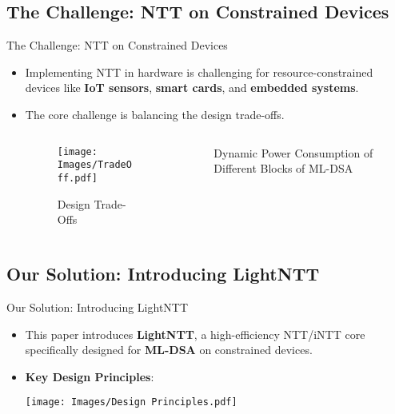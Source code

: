 \documentclass[
	10pt, t,
	hyperref={
		colorlinks,
		citecolor=CtpLatteTeal,
		linkcolor=CtpLatteTeal,
		urlcolor=CtpLatteBlue,
		pdfauthor={Bardia Taghavi},
		pdftitle={LightNTT: A Tiny NTT/iNTT Core for ML-DSA Featuring a Constant-Geometry Pipelined Design},
		pdfsubject={Cryptography},
		pdfkeywords={NTT, iNTT, ML-DSA, Constant-Geometry Pipelined Design},
		pdfcreator={Bardia Taghavi},
		pdfproducer={Bardia Taghavi}
		},
	aspectratio=1610,
	]
	{beamer}
\begin{document}
\subsection{The Challenge: NTT on Constrained Devices}
\begin{frame}{The Challenge: NTT on Constrained Devices}
	\begin{itemize}\setlength{\itemsep}{2ex}
		\item Implementing NTT in hardware is challenging for resource-constrained devices like \textbf{IoT sensors}, \textbf{smart cards}, and \textbf{embedded systems}.
		\item The core challenge is balancing the design trade-offs.
		\vspace{1em}
		\begin{columns}
			\begin{column}{0.5\textwidth}
				\begin{figure}
					\texttt{[image: Images/TradeOff.pdf]}
					\caption{\textcolor<-1>{FadeOverlay}{Design Trade-Offs}}
				\end{figure}
			\end{column}
			\begin{column}{0.5\textwidth}
				\begin{figure}
					\caption{\textcolor<-1>{FadeOverlay}{Dynamic Power Consumption of Different Blocks of ML-DSA}}
				\end{figure}
			\end{column}
		\end{columns}
	\end{itemize}
\end{frame}
\subsection{Our Solution: Introducing LightNTT}
\begin{frame}{Our Solution: Introducing LightNTT}
	\begin{itemize}\setlength{\itemsep}{2ex}
		\item This paper introduces \textbf{LightNTT}, a high-efficiency NTT/iNTT core specifically designed for \textbf{ML-DSA} on constrained devices.
		\item \textbf{Key Design Principles}:
		\vspace{1ex}
		\begin{center}
			\texttt{[image: Images/Design Principles.pdf]}
		\end{center}
	\end{itemize}
\end{frame}
\end{document}
